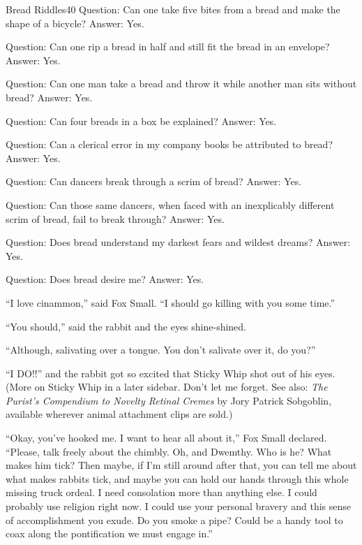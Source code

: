 \documentclass[12pt,twoside]{report}
\begin{document}
	\begin{sidebar}{Bread Riddles}{40}
		Question: Can one take five bites from a bread and make the shape of a bicycle? Answer: Yes.\vspace{6pt}
		
		Question: Can one rip a bread in half and still fit the bread in an envelope? Answer: Yes.\vspace{6pt}
		
		Question: Can one man take a bread and throw it while another man sits without bread? Answer: Yes.\vspace{6pt}
		
		Question: Can four breads in a box be explained? Answer: Yes.\vspace{6pt}
		
		Question: Can a clerical error in my company books be attributed to bread? Answer: Yes.\vspace{6pt}
		
		Question: Can dancers break through a scrim of bread? Answer: Yes.\vspace{6pt}
		
		Question: Can those same dancers, when faced with an inexplicably different scrim of bread, fail to break through? Answer: Yes.\vspace{6pt}
		
		Question: Does bread understand my darkest fears and wildest dreams? Answer: Yes.\vspace{6pt}
		
		Question: Does bread desire me? Answer: Yes.
	\end{sidebar}

``I love cinammon,'' said Fox Small.  ``I should go killing with you
some time.''

``You should,'' said the rabbit and the eyes shine-shined.

``Although, salivating over a tongue.  You don't salivate over it, do
you?''

``I DO!!'' and the rabbit got so excited that Sticky Whip shot out of
his eyes.  (More on Sticky Whip in a later sidebar. Don't let me
forget.  See also: {\em The Purist's Compendium to Novelty Retinal
  Cremes} by Jory Patrick Sobgoblin, available wherever animal
attachment clips are sold.)

``Okay, you've hooked me.  I want to hear all about it,'' Fox Small
declared. ``Please, talk freely about the chimbly.  Oh, and Dwemthy.
Who is he?  What makes him tick?  Then maybe, if I'm still around
after that, you can tell me about what makes rabbits tick, and maybe
you can hold our hands through this whole missing truck ordeal. I need
consolation more than anything else.  I could probably use religion
right now.  I could use your personal bravery and this sense of
accomplishment you exude.  Do you smoke a pipe?  Could be a handy tool
to coax along the pontification we must engage in.''
\end{document}
